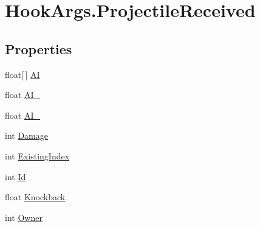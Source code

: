 \hypertarget{structOTA_1_1Plugin_1_1HookArgs_1_1ProjectileReceived}{}\section{Hook\+Args.\+Projectile\+Received}
\label{structOTA_1_1Plugin_1_1HookArgs_1_1ProjectileReceived}
\subsection*{Properties}
\begin{DoxyCompactItemize}
\item 
float\mbox{[}$\,$\mbox{]} \hyperlink{structOTA_1_1Plugin_1_1HookArgs_1_1ProjectileReceived_a3d326eb5ccbab41e91b0999bcdbd5c99}{A\+I}
\item 
float \hyperlink{structOTA_1_1Plugin_1_1HookArgs_1_1ProjectileReceived_a868950c116de23ad548e6b570e096ea7}{A\+I\+\_}
\item 
float \hyperlink{structOTA_1_1Plugin_1_1HookArgs_1_1ProjectileReceived_af739a5767285029634e6fc68bfeccf34}{A\+I\+\_}
\item 
int \hyperlink{structOTA_1_1Plugin_1_1HookArgs_1_1ProjectileReceived_ab16a3ebb727a38f50223c1be2ecd111d}{Damage}
\item 
int \hyperlink{structOTA_1_1Plugin_1_1HookArgs_1_1ProjectileReceived_ac2349edb075069d3fe3fd9012098a90e}{Existing\+Index}
\item 
int \hyperlink{structOTA_1_1Plugin_1_1HookArgs_1_1ProjectileReceived_afe0b47b3c92f2f69ea3da50cb72553eb}{Id}
\item 
float \hyperlink{structOTA_1_1Plugin_1_1HookArgs_1_1ProjectileReceived_ad22d30a3970ffaf441871a8c7cb6c1f5}{Knockback}
\item 
int \hyperlink{structOTA_1_1Plugin_1_1HookArgs_1_1ProjectileReceived_a1b5549aee7b8f03889fac15e1cf22552}{Owner}

\end{DoxyCompactItemize}
